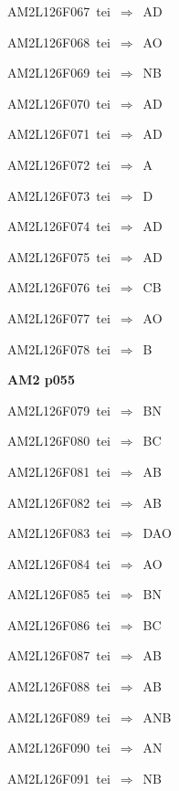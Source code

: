 {\sixrm AM2L126F067\ {\sixit tei}\ }$\Rightarrow$\ AD\par\smallskip
{\sixrm AM2L126F068\ {\sixit tei}\ }$\Rightarrow$\ AO\par\smallskip
{\sixrm AM2L126F069\ {\sixit tei}\ }$\Rightarrow$\ NB\par\smallskip
{\sixrm AM2L126F070\ {\sixit tei}\ }$\Rightarrow$\ AD\par\smallskip
{\sixrm AM2L126F071\ {\sixit tei}\ }$\Rightarrow$\ AD\par\smallskip
{\sixrm AM2L126F072\ {\sixit tei}\ }$\Rightarrow$\ A\par\smallskip
{\sixrm AM2L126F073\ {\sixit tei}\ }$\Rightarrow$\ D\par\smallskip
{\sixrm AM2L126F074\ {\sixit tei}\ }$\Rightarrow$\ AD\par\smallskip
{\sixrm AM2L126F075\ {\sixit tei}\ }$\Rightarrow$\ AD\par\smallskip
{\sixrm AM2L126F076\ {\sixit tei}\ }$\Rightarrow$\ CB\par\smallskip
{\sixrm AM2L126F077\ {\sixit tei}\ }$\Rightarrow$\ AO\par\smallskip
{\sixrm AM2L126F078\ {\sixit tei}\ }$\Rightarrow$\ B\par\smallskip

\par\vfill\eject
{\bf\hfill AM2 p055\hfill\hbox{}}\par\bigskip
{\sixrm AM2L126F079\ {\sixit tei}\ }$\Rightarrow$\ BN\par\smallskip
{\sixrm AM2L126F080\ {\sixit tei}\ }$\Rightarrow$\ BC\par\smallskip
{\sixrm AM2L126F081\ {\sixit tei}\ }$\Rightarrow$\ AB\par\smallskip
{\sixrm AM2L126F082\ {\sixit tei}\ }$\Rightarrow$\ AB\par\smallskip
{\sixrm AM2L126F083\ {\sixit tei}\ }$\Rightarrow$\ DAO\par\smallskip
{\sixrm AM2L126F084\ {\sixit tei}\ }$\Rightarrow$\ AO\par\smallskip
{\sixrm AM2L126F085\ {\sixit tei}\ }$\Rightarrow$\ BN\par\smallskip
{\sixrm AM2L126F086\ {\sixit tei}\ }$\Rightarrow$\ BC\par\smallskip
{\sixrm AM2L126F087\ {\sixit tei}\ }$\Rightarrow$\ AB\par\smallskip
{\sixrm AM2L126F088\ {\sixit tei}\ }$\Rightarrow$\ AB\par\smallskip
{\sixrm AM2L126F089\ {\sixit tei}\ }$\Rightarrow$\ ANB\par\smallskip
{\sixrm AM2L126F090\ {\sixit tei}\ }$\Rightarrow$\ AN\par\smallskip
{\sixrm AM2L126F091\ {\sixit tei}\ }$\Rightarrow$\ NB\par\smallskip

